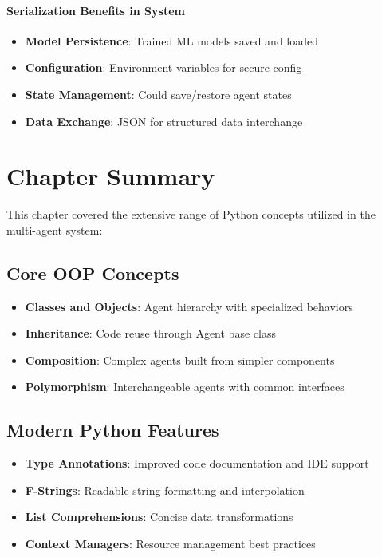 \paragraph{Serialization Benefits in System}
\begin{itemize}
\item \textbf{Model Persistence}: Trained ML models saved and loaded
\item \textbf{Configuration}: Environment variables for secure config
\item \textbf{State Management}: Could save/restore agent states
\item \textbf{Data Exchange}: JSON for structured data interchange
\end{itemize}

\section{Chapter Summary}

This chapter covered the extensive range of Python concepts utilized in the multi-agent system:

\subsection{Core OOP Concepts}
\begin{itemize}
\item \textbf{Classes and Objects}: Agent hierarchy with specialized behaviors
\item \textbf{Inheritance}: Code reuse through Agent base class
\item \textbf{Composition}: Complex agents built from simpler components
\item \textbf{Polymorphism}: Interchangeable agents with common interfaces
\end{itemize}

\subsection{Modern Python Features}
\begin{itemize}
\item \textbf{Type Annotations}: Improved code documentation and IDE support
\item \textbf{F-Strings}: Readable string formatting and interpolation
\item \textbf{List Comprehensions}: Concise data transformations
\item \textbf{Context Managers}: Resource management best practices
\end{itemize}

